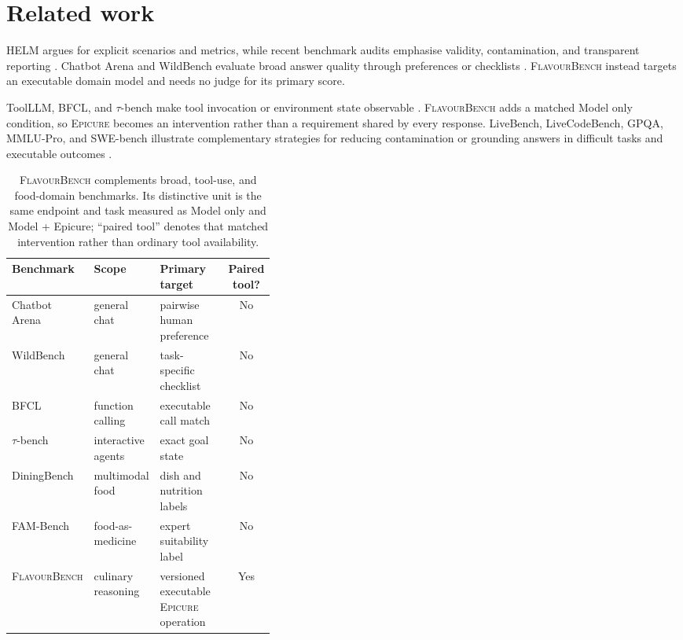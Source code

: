 \documentclass{article}
\newcommand{\system}{\textsc{FlavourBench}}
\newcommand{\epicure}{\textsc{Epicure}}
\begin{document}
\section{Related work}

HELM argues for explicit scenarios and metrics, while recent benchmark audits emphasise validity,
contamination, and transparent reporting \cite{liang2022helm,reuel2024betterbench}. Chatbot Arena
and WildBench evaluate broad answer quality through preferences or checklists
\cite{chiang2024chatbotarena,lin2024wildbench}. \system{} instead targets an executable domain model
and needs no judge for its primary score.

ToolLLM, BFCL, and $\tau$-bench make tool invocation or environment state observable
\cite{qin2023toolllm,patil2025bfcl,yao2024taubench}. \system{} adds a matched Model only condition,
so \epicure{} becomes an intervention rather than a requirement shared by every response. LiveBench,
LiveCodeBench, GPQA, MMLU-Pro, and SWE-bench illustrate complementary strategies for reducing
contamination or grounding answers in difficult tasks and executable outcomes
\cite{white2024livebench,jain2024livecodebench,rein2023gpqa,wang2024mmlupro,jimenez2023swebench}.

\begin{table}[t]
  \centering
  \small
  \begin{tabularx}{\linewidth}{@{}>{\raggedright\arraybackslash}p{0.19\linewidth}
      >{\raggedright\arraybackslash}p{0.20\linewidth} X c@{}}
    \toprule
    Benchmark & Scope & Primary target & \shortstack{Paired\\tool?} \\
    \midrule
    Chatbot Arena & general chat & pairwise human preference & No \\
    WildBench & general chat & task-specific checklist & No \\
    BFCL & function calling & executable call match & No \\
    $\tau$-bench & interactive agents & exact goal state & No \\
    DiningBench & multimodal food & dish and nutrition labels & No \\
    FAM-Bench & food-as-medicine & expert suitability label & No \\
    \system{} & culinary reasoning & versioned executable \epicure{} operation & Yes \\
    \bottomrule
  \end{tabularx}
  \caption{\system{} complements broad, tool-use, and food-domain benchmarks. Its distinctive unit
  is the same endpoint and task measured as Model only and Model + Epicure; ``paired tool'' denotes
  that matched intervention rather than ordinary tool availability.}
  \label{tab:benchmark-comparison}
\end{table}
\end{document}
